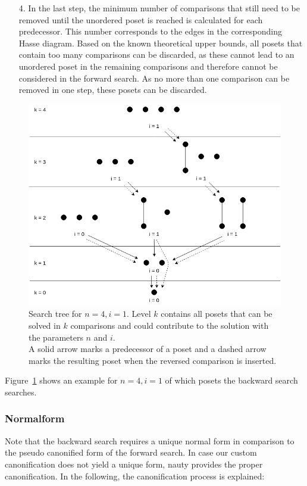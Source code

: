 \documentclass[10pt,journal,compsoc]{IEEEtran}
\begin{document}
\begin{itemize}
  \item[4.]
        In the last step, the minimum number of comparisons that still need to be removed until the unordered poset is reached is calculated for each predecessor.
        This number corresponds to the edges in the corresponding Hasse diagram.
        Based on the known theoretical upper bounds, all posets that contain too many comparisons can be discarded, as these cannot lead to an unordered poset in the remaining comparisons and therefore cannot be considered in the forward search.
        As no more than one comparison can be removed in one step, these posets can be discarded.
\end{itemize}

\begin{figure}[!b]
  \centering
  \includegraphics[width=\columnwidth]{figures/backward-search-tree.png}
  \caption{Search tree for $n = 4, i = 1$.
    Level $k$ contains all posets that can be solved in $k$ comparisons and could contribute to the solution with the parameters $n$ and $i$. \\
    A solid arrow marks a predecessor of a poset and a dashed arrow marks the resulting poset when the reversed comparison is inserted.}
  \label{fig:backward-search-tree}
\end{figure}

Figure~\ref{fig:backward-search-tree} shows an example for $n = 4, i = 1$ of which posets the backward search searches.

\subsubsection{Normalform} \label{sec:backward:normal_form}
Note that the backward search requires a unique normal form in comparison to the pseudo canonified form of the forward search.
In case our custom canonification does not yield a unique form, nauty provides the proper canonification.
In the following, the canonification process is explained:
\end{document}
